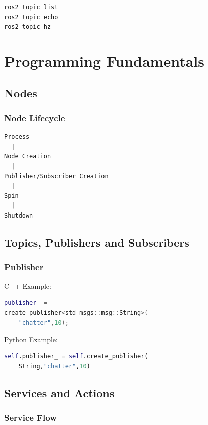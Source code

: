 \documentclass[11pt,oneside]{book}
\begin{document}
\begin{verbatim}
ros2 topic list
ros2 topic echo
ros2 topic hz
\end{verbatim}

\part{Programming Fundamentals}

\chapter{Nodes}

\section{Node Lifecycle}

\begin{verbatim}
Process
  |
Node Creation
  |
Publisher/Subscriber Creation
  |
Spin
  |
Shutdown
\end{verbatim}

\chapter{Topics, Publishers and Subscribers}

\section{Publisher}

C++ Example:

\begin{lstlisting}[language=C++]
publisher_ =
create_publisher<std_msgs::msg::String>(
    "chatter",10);
\end{lstlisting}

Python Example:

\begin{lstlisting}[language=Python]
self.publisher_ = self.create_publisher(
    String,"chatter",10)
\end{lstlisting}

\chapter{Services and Actions}

\section{Service Flow}
\end{document}
